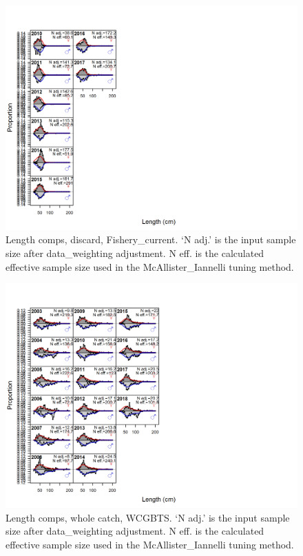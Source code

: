 \documentclass[12pt,]{article}
\begin{document}
\begin{figure}
\centering
\includegraphics{./r4ss/plots_mod1/comp_lenfit_flt1mkt1.png}
\caption{Length comps, discard, Fishery\_current. `N adj.' is the input
sample size after data\_weighting adjustment. N eff. is the calculated
effective sample size used in the McAllister\_Iannelli tuning method.
\label{fig:mod1_2_comp_lenfit_flt1mkt1}}
\end{figure}

\begin{figure}
\centering
\includegraphics{./r4ss/plots_mod1/comp_lenfit_flt5mkt0.png}
\caption{Length comps, whole catch, WCGBTS. `N adj.' is the input sample
size after data\_weighting adjustment. N eff. is the calculated
effective sample size used in the McAllister\_Iannelli tuning method.
\label{fig:mod1_3_comp_lenfit_flt5mkt0}}
\end{figure}
\end{document}
